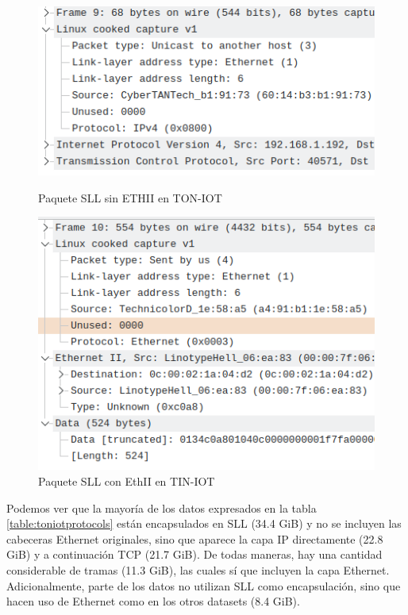 \begin{figure}[H]
  \includegraphics[width=\linewidth]{media/toniot_pcap_ssl_ip_packet.png}
  \captionsetup{justification=centering}
  \caption{Paquete SLL sin ETHII en TON-IOT}\label{fig:toniot_pcap_ssl_ip_packet}
  \endminipage\hfill
    \includegraphics[width=\linewidth]{media/toniot_pcap_ssl_eth_packet.png}
    \captionsetup{justification=centering}
    \caption{Paquete SLL con EthII en TIN-IOT}\label{fig:toniot_pcap_ssl_eth_packet}
  \endminipage\hfill
\end{figure}

Podemos ver que la mayoría de los datos expresados en la tabla \ref{table:toniotprotocols} están encapsulados en SLL (34.4 GiB) y no se incluyen las cabeceras Ethernet originales, sino que aparece la capa IP directamente (22.8 GiB) y a continuación TCP (21.7 GiB). De todas maneras, hay una cantidad considerable de tramas (11.3 GiB), las cuales sí que incluyen la capa Ethernet. Adicionalmente, parte de los datos no utilizan SLL como encapsulación, sino que hacen uso de Ethernet como en los otros datasets (8.4 GiB). 


